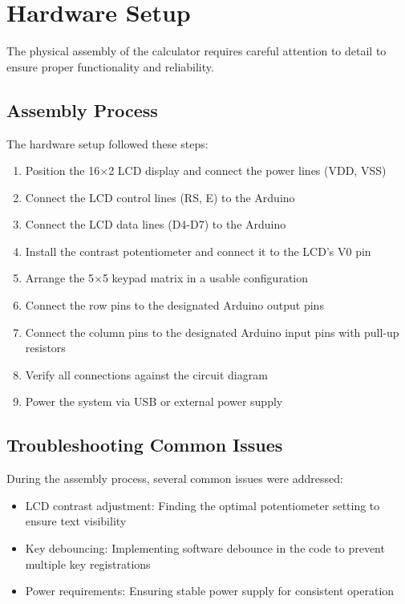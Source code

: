 \documentclass[12pt]{article}
\begin{document}
	\section{Hardware Setup}
	The physical assembly of the calculator requires careful attention to detail to ensure proper functionality and reliability.
	
	\subsection{Assembly Process}
	The hardware setup followed these steps:
	
	\begin{enumerate}
		\item Position the 16×2 LCD display and connect the power lines (VDD, VSS)
		\item Connect the LCD control lines (RS, E) to the Arduino
		\item Connect the LCD data lines (D4-D7) to the Arduino
		\item Install the contrast potentiometer and connect it to the LCD's V0 pin
		\item Arrange the 5×5 keypad matrix in a usable configuration
		\item Connect the row pins to the designated Arduino output pins
		\item Connect the column pins to the designated Arduino input pins with pull-up resistors
		\item Verify all connections against the circuit diagram
		\item Power the system via USB or external power supply
	\end{enumerate}
	
	\subsection{Troubleshooting Common Issues}
	During the assembly process, several common issues were addressed:
	
	\begin{itemize}
		\item LCD contrast adjustment: Finding the optimal potentiometer setting to ensure text visibility
		\item Key debouncing: Implementing software debounce in the code to prevent multiple key registrations
		\item Power requirements: Ensuring stable power supply for consistent operation
	\end{itemize}
	
\end{document}
